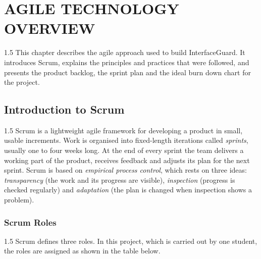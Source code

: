 \documentclass[12pt,a4paper]{article}
\begin{document}
\clearpage

\section{AGILE TECHNOLOGY OVERVIEW}

\begin{spacing}{1.5}
\justifying
This chapter describes the agile approach used to build InterfaceGuard. It
introduces Scrum, explains the principles and practices that were followed,
and presents the product backlog, the sprint plan and the ideal burn down
chart for the project.
\end{spacing}

\subsection{Introduction to Scrum}

\begin{spacing}{1.5}
\justifying
Scrum is a lightweight agile framework for developing a product in small,
usable increments. Work is organised into fixed-length iterations called
\emph{sprints}, usually one to four weeks long. At the end of every sprint the
team delivers a working part of the product, receives feedback and adjusts
its plan for the next sprint. Scrum is based on \emph{empirical process
control}, which rests on three ideas: \emph{transparency} (the work and its
progress are visible), \emph{inspection} (progress is checked regularly) and
\emph{adaptation} (the plan is changed when inspection shows a problem).
\end{spacing}

\subsubsection{Scrum Roles}

\begin{spacing}{1.5}
\justifying
Scrum defines three roles. In this project, which is carried out by one
student, the roles are assigned as shown in the table below.
\end{spacing}
\end{document}

